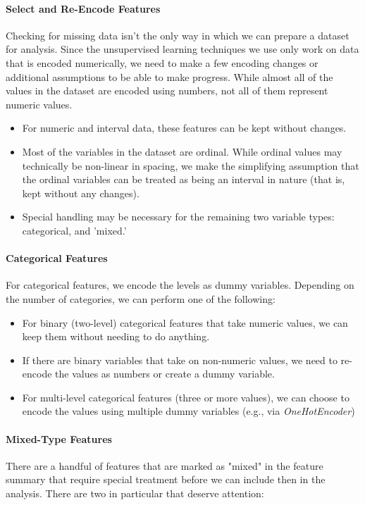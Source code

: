 \paragraph{Select and Re-Encode Features}
Checking for missing data isn't the only way in which we can prepare a dataset for analysis. Since the unsupervised learning techniques we use only work on data that is encoded numerically, we need to make a few encoding changes or additional assumptions to be able to make progress. While almost all of the values in the dataset are encoded using numbers, not all of them represent numeric values.

\begin{itemize}
    \item For numeric and interval data, these features can be kept without changes.
    \item Most of the variables in the dataset are ordinal. While ordinal values may technically be non-linear in spacing, we make the simplifying assumption that the ordinal variables can be treated as being an interval in nature (that is, kept without any changes).
    \item Special handling may be necessary for the remaining two variable types: categorical, and 'mixed.'
\end{itemize}

\paragraph{Categorical Features}
For categorical features, we encode the levels as dummy variables. Depending on the number of categories, we can perform one of the following:
\begin{itemize}
    \item For binary (two-level) categorical features that take numeric values, we can keep them without needing to do anything.
    \item If there are binary variables that take on non-numeric values, we need to re-encode the values as numbers or create a dummy variable.
    \item For multi-level categorical features (three or more values), we can choose to encode the values using multiple dummy variables (e.g., via \emph{OneHotEncoder})
\end{itemize}

\paragraph{Mixed-Type Features}
There are a handful of features that are marked as "mixed" in the feature summary that require special treatment before we can include then in the analysis. There are two in particular that deserve attention:

